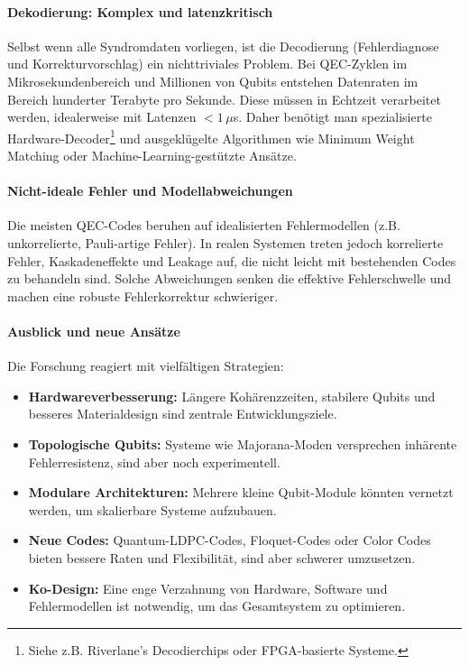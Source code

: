 \paragraph{Dekodierung: Komplex und latenzkritisch}
Selbst wenn alle Syndromdaten vorliegen, ist die Decodierung (Fehlerdiagnose und Korrekturvorschlag) ein nichttriviales Problem. Bei QEC-Zyklen im Mikrosekundenbereich und Millionen von Qubits entstehen Datenraten im Bereich hunderter Terabyte pro Sekunde. Diese m\"ussen in Echtzeit verarbeitet werden, idealerweise mit Latenzen $<1\,\mu$s. Daher ben\"otigt man spezialisierte Hardware-Decoder\footnote{Siehe z.B. Riverlane's Decodierchips oder FPGA-basierte Systeme.} und ausgekl\"ugelte Algorithmen wie Minimum Weight Matching oder Machine-Learning-gest\"utzte Ans\"atze.

\paragraph{Nicht-ideale Fehler und Modellabweichungen}
Die meisten QEC-Codes beruhen auf idealisierten Fehlermodellen (z.B. unkorrelierte, Pauli-artige Fehler). In realen Systemen treten jedoch korrelierte Fehler, Kaskadeneffekte und Leakage auf, die nicht leicht mit bestehenden Codes zu behandeln sind. Solche Abweichungen senken die effektive Fehlerschwelle und machen eine robuste Fehlerkorrektur schwieriger.\\

\paragraph{Ausblick und neue Ans\"atze}
Die Forschung reagiert mit vielf\"altigen Strategien:
\begin{itemize}
    \item \textbf{Hardwareverbesserung:} Längere Kohärenzzeiten, stabilere Qubits und besseres Materialdesign sind zentrale Entwicklungsziele.
    \item \textbf{Topologische Qubits:} Systeme wie Majorana-Moden versprechen inhärente Fehlerresistenz, sind aber noch experimentell.
    \item \textbf{Modulare Architekturen:} Mehrere kleine Qubit-Module könnten vernetzt werden, um skalierbare Systeme aufzubauen.
    \item \textbf{Neue Codes:} Quantum-LDPC-Codes, Floquet-Codes oder Color Codes bieten bessere Raten und Flexibilität, sind aber schwerer umzusetzen.
    \item \textbf{Ko-Design:} Eine enge Verzahnung von Hardware, Software und Fehlermodellen ist notwendig, um das Gesamtsystem zu optimieren.
\end{itemize}

